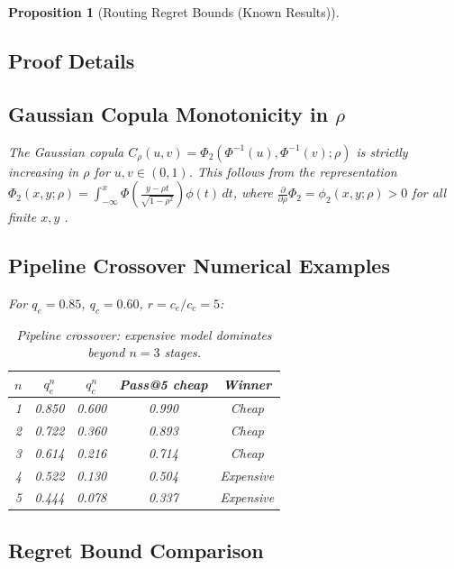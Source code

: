 \documentclass[11pt, a4paper, copyright]{googledeepmind}
\newtheorem{proposition}{Proposition}[section]
\begin{document}
\begin{proposition}[Routing Regret Bounds (Known Results)]
\begin{appendices}

\section{Proof Details}
\label{app:proofs}

\subsection{Gaussian Copula Monotonicity in $\rho$}

The Gaussian copula $C_\rho(u,v) = \Phi_2(\Phi^{-1}(u), \Phi^{-1}(v); \rho)$ is strictly increasing in $\rho$ for $u, v \in (0,1)$. This follows from the representation $\Phi_2(x, y; \rho) = \int_{-\infty}^{x} \Phi\left(\frac{y - \rho t}{\sqrt{1 - \rho^2}}\right) \phi(t)\, dt$, where $\frac{\partial}{\partial \rho} \Phi_2 = \phi_2(x, y; \rho) > 0$ for all finite $x, y$ \citep{nelsen2006copulas}.

\subsection{Pipeline Crossover Numerical Examples}

For $q_e = 0.85$, $q_c = 0.60$, $r = c_e / c_c = 5$:

\begin{table}[htbp]
\centering
\begin{tabular}{ccccc}
\toprule
$n$ & $q_e^n$ & $q_c^n$ & Pass@5 cheap & Winner \\
\midrule
1 & 0.850 & 0.600 & 0.990 & Cheap \\
2 & 0.722 & 0.360 & 0.893 & Cheap \\
3 & 0.614 & 0.216 & 0.714 & Cheap \\
4 & 0.522 & 0.130 & 0.504 & Expensive \\
5 & 0.444 & 0.078 & 0.337 & Expensive \\
\bottomrule
\end{tabular}
\caption{Pipeline crossover: expensive model dominates beyond $n = 3$ stages.}
\end{table}

\subsection{Regret Bound Comparison}


\end{appendices}
\end{proposition}
\end{document}
